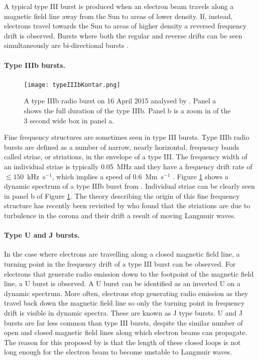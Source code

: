 A typical type III burst is produced when an electron beam travels along a magnetic field line away from the Sun to areas of lower density. If, instead, electrons travel towards the Sun to areas of higher density a reversed frequency drift is observed. Bursts where both the regular and reverse drifts can be seen simultaneously are bi-directional bursts \citep{Reid2014}.

\paragraph{Type IIIb bursts.}

\begin{figure}[ht]
\centering
\texttt{[image: typeIIIbKontar.png]}
\caption[The type IIIb radio burst from \cite{Kontar2017}.]{A type IIIb radio burst on 16 April 2015 analysed by \cite{Kontar2017}. Panel a shows the full duration of the type IIIb. Panel b is a zoom in of the 3 second wide box in panel a.}
\label{fig:typeIIIbKontar}
\end{figure}

Fine frequency structures are sometimes seen in type III bursts. Type IIIb radio bursts are defined as a number of narrow, nearly horizontal, frequency bands called striae, or striations, in the envelope of a type III. The frequency width of an individual striae is typically 0.05~MHz \citep{McLean1985} and they have a frequency drift rate of $\lesssim 150$~kHz~s$^{-1}$, which implies a speed of 0.6~Mm~s$^{-1}$ \cite{Sharykin2018}. Figure \ref{fig:typeIIIbKontar} shows a dynamic spectrum of a type IIIb burst from \cite{Kontar2017}. Individual striae can be clearly seen in panel b of Figure \ref{fig:typeIIIbKontar}. The theory describing the origin of this fine frequency structure has recently been revisited by \cite{Reid2021} who found that the striations are due to turbulence in the corona and their drift a result of moving Langmuir waves.

\paragraph{Type U and J bursts.}

In the case where electrons are travelling along a closed magnetic field line, a turning point in the frequency drift of a type III burst can be observed. For electrons that generate radio emission down to the footpoint of the magnetic field line, a U burst is observed. A U burst can be identified as an inverted U on a dynamic spectrum. More often, electrons stop generating radio emission as they travel back down the magnetic field line so only the turning point in frequency drift is visible in dynamic spectra. These are known as J type bursts. U and J bursts are far less common than type III bursts, despite the similar number of open and closed magnetic field lines along which electron beams can propagate. The reason for this proposed by \cite{Reid2017} is that the length of these closed loops is not long enough for the electron beam to become unstable to Langmuir waves.

